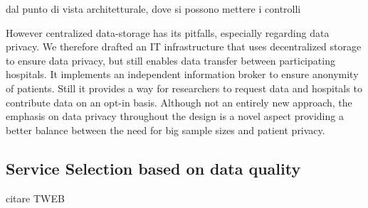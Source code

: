 \cite{10.1007/978-3-642-10665-1_11} dal punto di vista architetturale, dove si possono mettere i controlli

\cite{balancingInMedicine} However centralized data-storage has its pitfalls, especially regarding data privacy. We therefore drafted an IT infrastructure that uses decentralized storage to ensure data privacy, but still enables data transfer between participating hospitals. It implements an independent information broker to ensure anonymity of patients. Still it provides a way for researchers to request data and hospitals to contribute data on an opt-in basis. Although not an entirely new approach, the emphasis on data privacy throughout the design is a novel aspect providing a better balance between the need for big sample sizes and patient privacy. 

\subsection{Service Selection based on data quality} 
citare TWEB
